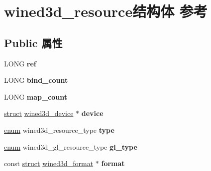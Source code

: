 \hypertarget{structwined3d__resource}{}\section{wined3d\+\_\+resource结构体 参考}
\label{structwined3d__resource}
\subsection*{Public 属性}
\begin{DoxyCompactItemize}
\item 
\mbox{\label{structwined3d__resource_a02fc05ee99ffc7d9e10977ae94805165}} 
L\+O\+NG {\bfseries ref}
\item 
\mbox{\label{structwined3d__resource_a36ceb347e6e6e525cea028fed0272f8a}} 
L\+O\+NG {\bfseries bind\+\_\+count}
\item 
\mbox{\label{structwined3d__resource_ad45a8ad43ef285a56e5332619f4a6fbc}} 
L\+O\+NG {\bfseries map\+\_\+count}
\item 
\mbox{\label{structwined3d__resource_a92925e31838c4ae46dc5663702c80ada}} 
\hyperlink{interfacestruct}{struct} \hyperlink{structwined3d__device}{wined3d\+\_\+device} $\ast$ {\bfseries device}
\item 
\mbox{\label{structwined3d__resource_a693faab048e256daf9604ccceb2e1b0d}} 
\hyperlink{interfaceenum}{enum} wined3d\+\_\+resource\+\_\+type {\bfseries type}
\item 
\mbox{\label{structwined3d__resource_ab6440a4133a7ef9d1facc4a4b2cf76e8}} 
\hyperlink{interfaceenum}{enum} wined3d\+\_\+gl\+\_\+resource\+\_\+type {\bfseries gl\+\_\+type}
\item 
\mbox{\label{structwined3d__resource_ab735278cc2bd3bc0147a72db67ff2afd}} 
const \hyperlink{interfacestruct}{struct} \hyperlink{structwined3d__format}{wined3d\+\_\+format} $\ast$ {\bfseries format}
\item 
\mbox{\label{structwined3d__resource_a73f8628c9c1c397526b3173a719b31cc}} 

\end{DoxyCompactItemize}
